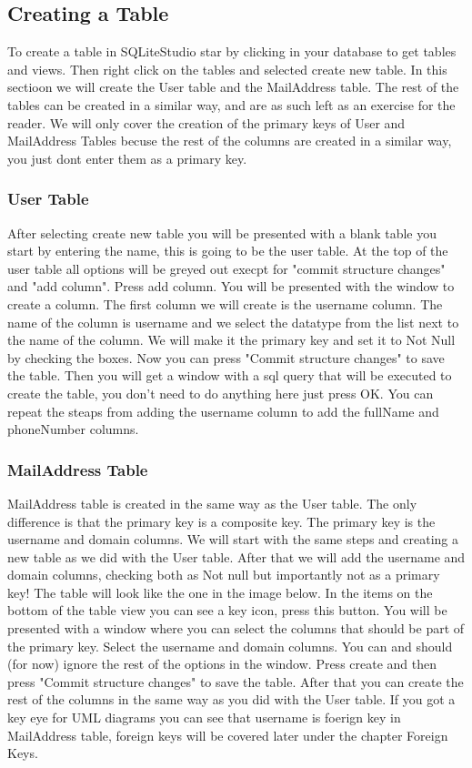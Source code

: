 \documentclass[a4paper,11pt,oneside]{article}
\begin{document}
\begin{sloppypar}
\subsection{Creating a Table}
\label{sqliteStudioCreatingTable}
To create a table in SQLiteStudio star by clicking in your database to get tables and views. Then right click on the tables and selected create new table. In this sectioon we will create the User table and the MailAddress table. The rest of the tables can be created in a similar way, and are as such left as an exercise for the reader. We will only cover the creation of the primary keys of User and MailAddress Tables becuse the rest of the columns are created in a similar way, you just dont enter them as a primary key.

\subsubsection{User Table}
\label{sqliteStudioUserTable}
After selecting create new table you will be presented with a blank table you start by entering the name, this is going to be the user table. At the top of the user table all options will be greyed out execpt for "commit structure changes" and "add column". Press add column. You will be presented with the window to create a column. The first column we will create is the username column. The name of the column is username and we select the datatype from the list next to the name of the column. We will make it the primary key and set it to Not Null by checking the boxes. Now you can press "Commit structure changes" to save the table. Then you will get a window with a sql query that will be executed to create the table, you don't need to do anything here just press OK. You can repeat the steaps from adding the username column to add the fullName and phoneNumber columns.   

\subsubsection{MailAddress Table}
\label{sqliteStudioMailAddressTable}
MailAddress table is created in the same way as the User table. The only difference is that the primary key is a composite key. The primary key is the username and domain columns. We will start with the same steps and creating a new table as we did with the User table. After that we will add the username and domain columns, checking both as Not null but importantly not as a primary key! The table will look like the one in the image below. In the items on the bottom of the table view you can see a key icon, press this button. You will be presented with a window where you can select the columns that should be part of the primary key. Select the username and domain columns. You can and should (for now) ignore the rest of the options in the window. Press create and then press "Commit structure changes" to save the table. After that you can create the rest of the columns in the same way as you did with the User table.
If you got a key eye for UML diagrams you can see that username is foerign key in MailAddress table, foreign keys will be covered later under the chapter Foreign Keys.  

\end{sloppypar}
\end{document}
